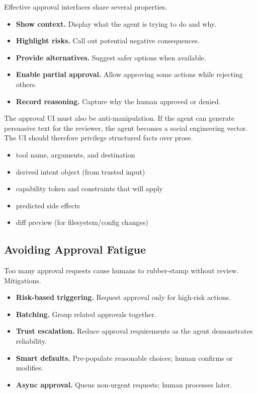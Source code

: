Effective approval interfaces share several properties.
\begin{itemize}
\item \textbf{Show context.} Display what the agent is trying to do and why.
\item \textbf{Highlight risks.} Call out potential negative consequences.
\item \textbf{Provide alternatives.} Suggest safer options when available.
\item \textbf{Enable partial approval.} Allow approving some actions while rejecting others.
\item \textbf{Record reasoning.} Capture why the human approved or denied.
\end{itemize}

The approval UI must also be anti-manipulation. If the agent can generate persuasive text for the reviewer, the agent becomes a social engineering vector. The UI should therefore privilege structured facts over prose.
\begin{itemize}
\item tool name, arguments, and destination
\item derived intent object (from trusted input)
\item capability token and constraints that will apply
\item predicted side effects
\item diff preview (for filesystem/config changes)
\end{itemize}

\subsection{Avoiding Approval Fatigue}

Too many approval requests cause humans to rubber-stamp without review. Mitigations.
\begin{itemize}
\item \textbf{Risk-based triggering.} Request approval only for high-risk actions.
\item \textbf{Batching.} Group related approvals together.
\item \textbf{Trust escalation.} Reduce approval requirements as the agent demonstrates reliability.
\item \textbf{Smart defaults.} Pre-populate reasonable choices; human confirms or modifies.
\item \textbf{Async approval.} Queue non-urgent requests; human processes later.
\end{itemize}

